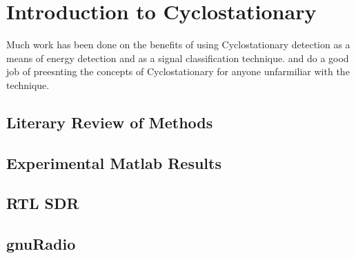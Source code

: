 
\chapter{Introduction to Cyclostationary}

Much work has been done on the benefits of using Cyclostationary detection as a
means of energy detection and as a signal classification technique. 
\cite{costa96} and \cite{kim2007} do a good job of preesnting the concepts of
Cyclostationary for anyone unfarmiliar with the technique.  
\section{Literary Review of Methods}
\section{Experimental Matlab Results}
\section{RTL SDR}
\section{gnuRadio}
